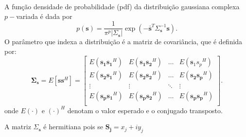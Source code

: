 A função densidade de probabilidade ({\boldmath pdf}) da distribuição gaussiana complexa $p-$variada é dada por
\begin{equation}\label{eqn1}
	p(\mathbf{s})=\frac{1}{\pi^p|\Sigma_{\mathbf{s}}|}\exp(-\bar{\mathbf{s}}^{T}\Sigma_{\mathbf{s}}^{-1}\mathbf{s}).
\end{equation}
O parâmetro que indexa a distribuição é a matriz de covariância, que é definida por:
\begin{equation}\label{eqn2}
	\mathbf{ \Sigma_{s}} = E[\mathbf{ss}^H] = \left[
\begin{array}{cccc}
	E(\mathbf{s_1s_1}^H)  & E(\mathbf{s_1s_2}^H) &\hdots & E({\mathbf s_1s_p}^H) \\
	E(\mathbf{ s_2s_1}^H)  & E(\mathbf {s_2 s_2}^H) &\hdots &E(\mathbf {s_2 s_p}^H)\\
        \vdots&\vdots &\ddots &\vdots\\
	E(\mathbf{ s_ps_1}^H)  & E(\mathbf {s_ps_2}^H) &\hdots &E(\mathbf {s_ps_p}^H)\\
\end{array}
\right].
\end{equation}
onde $E(\cdot)$ e $(\cdot)^H$ denotam o valor esperado e o conjugado transposto.

A matriz {\boldmath$\Sigma_{\mathbf{s}}$} é hermitiana pois se $\mathbf {S_j}= x_j+iy_j $

